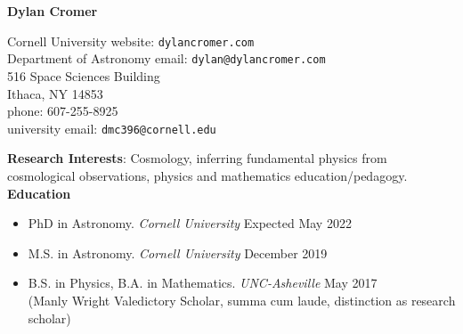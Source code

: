 \documentclass[letterpaper, 11pt]{article}
\title{}
\author{}
\date{Last Edited: \today}
\newcommand{\myrule}{\hrulefill}
\newcommand{\noi}{\noindent}
\begin{document}
\begin{center}
\textbf{Dylan Cromer} 
\\
\vspace{1.3em}
\myrule
\end{center}

\noi Cornell University \hfill website: \texttt{dylancromer.com}
\\
Department of Astronomy \hfill email: \texttt{dylan@dylancromer.com}
\\
516 Space Sciences Building \hfill
\\
Ithaca, NY 14853 \hfill
\\
phone: 607-255-8925 \hfill
\\
university email: \texttt{dmc396@cornell.edu} \hfill
\\

\fancyfoot{\myrule \\ Dylan Cromer \hfill \thepage}

\noi \textbf{Research Interests}: Cosmology, inferring fundamental physics from cosmological observations, physics and mathematics education/pedagogy.
\\

\noi \textbf{Education}
\begin{itemize}[leftmargin=*]

	\item \noi PhD in Astronomy. \emph{Cornell University} \hfill Expected May 2022

    \item \noi M.S. in Astronomy. \emph{Cornell University} \hfill December 2019
	
	\item \noi B.S. in Physics, B.A. in Mathematics. \emph{UNC-Asheville} \hfill May 2017
		\\
	(Manly Wright Valedictory Scholar, summa cum laude, distinction as research scholar)

\end{itemize}
\end{document}
